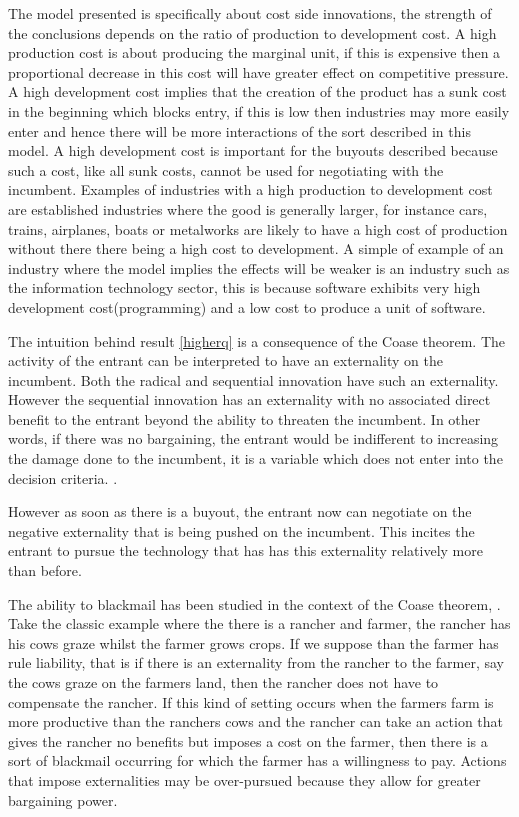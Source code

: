 \documentclass[11pt]{article}
\begin{document}
The model presented is specifically about cost side innovations, the strength of the conclusions depends on the ratio of production to development cost. A high production cost is about producing the marginal unit, if this is expensive then a proportional decrease in this cost will have greater effect on competitive pressure. A high development cost implies that the creation of the product has a sunk cost in the beginning which blocks entry, if this is low then industries may more easily enter and hence there will be more interactions of the sort described in this model. A high development cost is important for the buyouts described because such a cost, like all sunk costs, cannot be used for negotiating with the incumbent. Examples of industries with a high production to development cost are established industries where the good is generally larger, for instance cars, trains, airplanes, boats or metalworks are likely to have a high cost of production without there there being a high cost to development. A simple of example of an industry where the model implies the effects will be weaker is an industry such as the information technology sector, this is because software exhibits very high development cost(programming) and a low cost to produce a unit of software.  

The intuition behind result \ref{higherq} is a consequence of the Coase theorem. The activity of the entrant can be interpreted to have an externality on the incumbent. Both the radical and sequential innovation have such an externality. However the sequential innovation has an externality with no associated direct benefit to the entrant beyond the ability to threaten the incumbent. In other words, if there was no bargaining, the entrant would be indifferent to increasing the damage done to the incumbent, it is a variable which does not enter into the decision criteria. .

However as soon as there is a buyout, the entrant now can negotiate on the negative externality that is being pushed on the incumbent. This incites the entrant to pursue the technology that has has this externality relatively more than before. 

The ability to blackmail has been studied in the context of the Coase theorem, \cite{Dem}. Take the classic example where the there is a rancher and farmer, the rancher has his cows graze whilst the farmer grows crops. If we suppose than the farmer has rule liability, that is if there is an externality from the rancher to the farmer, say the cows graze on the farmers land, then the rancher does not have to compensate the rancher. If this kind of setting occurs when the farmers farm is more productive than the ranchers cows and the rancher can take an action that gives the rancher no benefits but imposes a cost on the farmer, then there is a sort of blackmail occurring for which the farmer has a willingness to pay. Actions that impose externalities may be over-pursued because they allow for greater bargaining power. 
\end{document}
